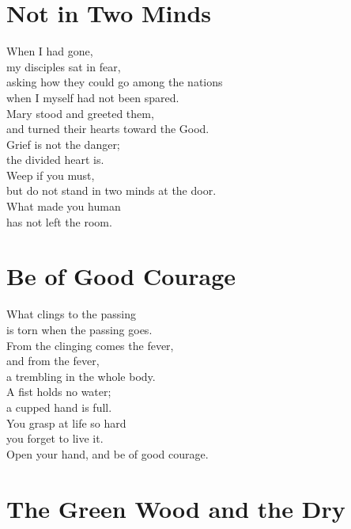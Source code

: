 \documentclass[10pt, openright]{book}
\newcommand{\sectionbreak}{\filbreak}
\newcommand{\sayingsource}[1]{\par\nopagebreak\vspace{0.3\baselineskip}{\raggedleft\footnotesize\itshape #1\par}}
\begin{document}
\sectionbreak

\section{Not in Two Minds}\label{not-in-two-minds}

When I had gone,\\
my disciples sat in fear,\\
asking how they could go among the nations\\
when I myself had not been spared.\\
Mary stood and greeted them,\\
and turned their hearts toward the Good.\\
Grief is not the danger;\\
the divided heart is.\\
Weep if you must,\\
but do not stand in two minds at the door.\\
What made you human\\
has not left the room.

\sayingsource{Mary 9}

\sectionbreak

\section{Be of Good Courage}\label{be-of-good-courage}

What clings to the passing\\
is torn when the passing goes.\\
From the clinging comes the fever,\\
and from the fever,\\
a trembling in the whole body.\\
A fist holds no water;\\
a cupped hand is full.\\
You grasp at life so hard\\
you forget to live it.\\
Open your hand, and be of good courage.

\sayingsource{Tao Te Ching 75 · Mary 7--8}

\sectionbreak

\section{The Green Wood and the Dry}\label{the-green-wood-and-the-dry}
\end{document}
